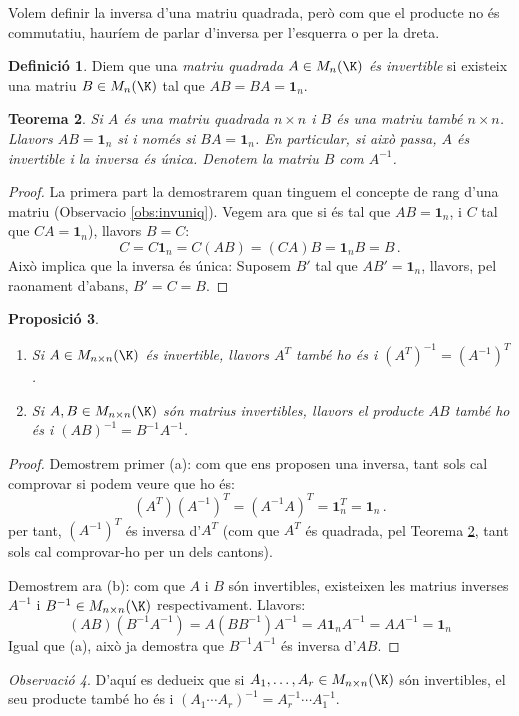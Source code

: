 \documentclass[a4paper,12pt,twoside]{article}
\newcommand{\1}{\mathbf{1}}
\newcommand{\0}{\mathbf{0}}
\newtheorem{teorema}{Teorema}[section]
\newtheorem{proposicio}[teorema]{Proposició}
\theoremstyle{definition}
\newtheorem{definicio}[teorema]{Definició}
\theoremstyle{remark}
\newtheorem{observacio}[teorema]{Observació}
\begin{document}
Volem definir la inversa d'una matriu quadrada, però com que el producte no és commutatiu, hauríem de parlar d'inversa per l'esquerra o per la dreta.
\begin{definicio}
Diem que una \emph{matriu quadrada $A \in M_{n}(\K)$ és invertible} si existeix una matriu $B \in M_n(\K)$ tal que $AB=BA=\1_n$.\\
\end{definicio}
\begin{teorema}\label{teo:invuniq}
	Si $A$ és una matriu quadrada $n\times n$ i $B$ és una matriu també $n\times n$. Llavors $AB=\1_n$ si i només si $BA=\1_n$. En particular, si això passa, $A$ és invertible i la inversa és única. Denotem la matriu $B$ com $A^{-1}$.
\end{teorema}
\begin{proof}
	La primera part la demostrarem quan tinguem el concepte de rang d'una matriu (Observacio \ref{obs:invuniq}). Vegem ara que si és tal que $AB=\1_n$, i $C$ tal que $CA=\1_n$), llavors $B=C$:
	$$
	C = C \1_n = C(AB)=(CA)B=\1_n B=B \,.
	$$
	Això implica que la inversa és única: Suposem $B'$ tal que $AB'=\1_n$, llavors, pel raonament d'abans, $B'=C=B$.
\end{proof}
\begin{proposicio}
	\begin{enumerate}[\rm (a)]
		\item Si $A \in M_{n\times n}(\K)$ és invertible, llavors $A^T$ també ho és i $(A^T)^{-1}=(A^{-1})^T$.
		\item Si $A,B \in M_{n\times n}(\K)$ són matrius invertibles, llavors el producte $AB$ també ho és i $(AB)^{-1}=B^{-1}A^{-1}$.
	\end{enumerate}
\end{proposicio}
\begin{proof}
	Demostrem primer (a): com que ens proposen una inversa, tant sols cal comprovar si podem veure que ho és:
	$$
	(A^T)(A^{-1})^T=(A^{-1}A)^T=\1_n^T=\1_n \,.
	$$
	per tant, $(A^{-1})^T$ és inversa d'$A^T$ (com que $A^T$ és quadrada, pel Teorema \ref{teo:invuniq}, tant sols cal comprovar-ho per un dels cantons).
	
	Demostrem ara (b): com que $A$ i $B$ són invertibles, existeixen les matrius inverses $A^{-1}$ i $B^{-1}\in M_{n\times n}(\K)$ respectivament. Llavors:
	$$
	(AB)(B^{-1}A^{-1})=A(BB^{-1})A^{-1}=A\1_n A^{-1}=A A^{-1}=\1_n
	$$
	Igual que (a), això ja demostra que $B^{-1}A^{-1}$ és inversa d'$AB$.
\end{proof}
\begin{observacio}
	D'aquí es dedueix que si $A_1, \dots, A_r \in M_{n\times n}(\K)$ són invertibles, el seu producte també ho és i $(A_1\cdots A_r)^{-1}=A_r^{-1}\cdots A_1^{-1}$.
\end{observacio}
\end{document}
